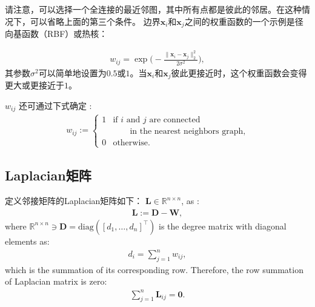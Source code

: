 \documentclass[lang=cn,10pt]{gorgeousnbook}
\numberwithin{equation}{section}%
\numberwithin{figure}{section}%
\begin{document}
请注意，可以选择一个全连接的最近邻图，其中所有点都是彼此的邻居。在这种情况下，可以省略上面的第三个条件\cite{ng2001spectral}。
边界$\boldsymbol{x}_i$和$\boldsymbol{x}_j$之间的权重函数的一个示例是径向基函数（RBF）或热核\cite{belkin2001laplacian}：

\begin{align}\label{equation_RBF_kernel}
w_{ij} = \exp\Big(\!\!-\frac{\|\boldsymbol{x}_i - \boldsymbol{x}_j\|_2^2}{2 \sigma^2}\Big),
\end{align}
其参数$\sigma^2$可以简单地设置为$0.5$或$1$。当$\boldsymbol{x}_i$和$\boldsymbol{x}_j$彼此更接近时，这个权重函数会变得更大或更接近于$1$。

$w_{ij}$ 还可通过下式确定 \cite{belkin2001laplacian}:
\begin{align}\label{equation_simple_minded}
w_{ij} := 
\left\{
    \begin{array}{ll}
        1 & \mbox{if } i \text{ and } j \text{ are connected} \\
        & \quad \quad \text{in the nearest neighbors graph}, \\
        0 & \mbox{otherwise. } 
    \end{array}
\right.
\end{align}


\subsection{Laplacian矩阵}\label{section_Laplacian_matrix_definition}

定义邻接矩阵的Laplacian矩阵如下：
$\boldsymbol{L} \in \mathbb{R}^{n \times n}$, as \cite{merris1994laplacian}:
\begin{align}\label{equation_Laplacian_matrix}
\boldsymbol{L} := \boldsymbol{D} - \boldsymbol{W},
\end{align}
where $\mathbb{R}^{n \times n} \ni \boldsymbol{D} = \text{diag}([d_1, \dots, d_n]^\top)$ is the degree matrix with diagonal elements as:
\begin{align}\label{equation_degree_matrix}
d_i = \sum_{j=1}^n w_{ij},
\end{align}
which is the summation of its corresponding row. 
Therefore, the row summation of Laplacian matrix is zero:
\begin{align}\label{equation_Laplacian_row_sum}
\sum_{j=1}^n \boldsymbol{L}_{ij} = \boldsymbol{0}.
\end{align}
\end{document}
